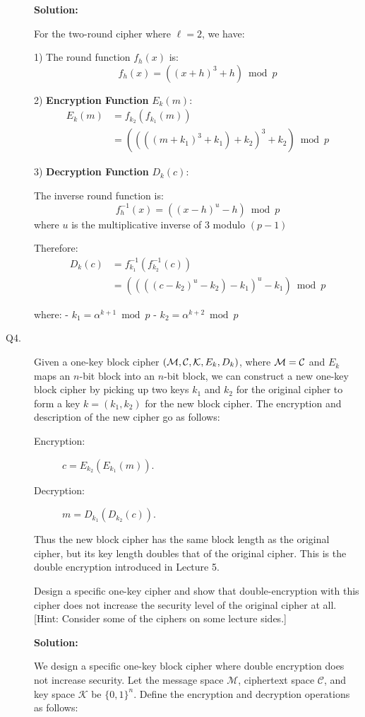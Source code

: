 \documentclass[11pt,epsfig]{article}
\newcommand{\cM}{{\cal M}}
\newcommand{\cC}{{\cal C}}
\newcommand{\cK}{{\cal K}}
\begin{document}
\begin{description}
\textbf{Solution:}

For the two-round cipher where $\ell = 2$, we have:

1) The round function $f_h(x)$ is:
\[ f_h(x) = ((x + h)^3 + h) \bmod p \]

2) \textbf{Encryption Function} $E_k(m)$:
\begin{align*}
E_k(m) &= f_{k_2}(f_{k_1}(m)) \\
&= \left( \left( \left( (m + k_1)^3 + k_1 \right) + k_2 \right)^3 + k_2 \right) \bmod p
\end{align*}

3) \textbf{Decryption Function} $D_k(c)$:

The inverse round function is:
\[ f_h^{-1}(x) = ((x - h)^u - h) \bmod p \]
where $u$ is the multiplicative inverse of 3 modulo $(p - 1)$

Therefore:
\begin{align*}
D_k(c) &= f_{k_1}^{-1}(f_{k_2}^{-1}(c)) \\
&= \left( \left( \left( (c - k_2)^u - k_2 \right) - k_1 \right)^u - k_1 \right) \bmod p
\end{align*}

where:
- $k_1 = \alpha^{k+1} \bmod p$
- $k_2 = \alpha^{k+2} \bmod p$


\item[Q4.] 
Given a one-key block cipher $(\cM, \cC, \cK, E_k, D_{k})$, where $\cM=\cC$ and $E_k$ 
maps an $n$-bit block into an $n$-bit block, we can 
construct a new one-key block cipher by picking up two keys $k_1$ and $k_2$ for the 
original cipher to form a key $k=(k_1,k_2)$ for the new block cipher. The 
encryption and description of the new cipher go as follows: 
\begin{description}
\item[Encryption:] $c=E_{k_2}(E_{k_1}(m))$. 
\item[Decryption:] $m=D_{k_1}(D_{k_2}(c))$.  
\end{description}
Thus the new block cipher has the same block length as the original cipher, 
but its key length doubles that of the original cipher. This is the double 
encryption introduced in Lecture 5. 

Design a specific one-key cipher and show that double-encryption with 
this cipher does not increase the security level of the original cipher at all. 
[Hint: Consider some of the ciphers on some lecture sides.] \hfill {}

\textbf{Solution:}

We design a specific one-key block cipher where double encryption does not increase security. Let the message space \(\mathcal{M}\), ciphertext space \(\mathcal{C}\), and key space \(\mathcal{K}\) be \(\{0,1\}^n\). Define the encryption and decryption operations as follows:


\end{description}
\end{document}
